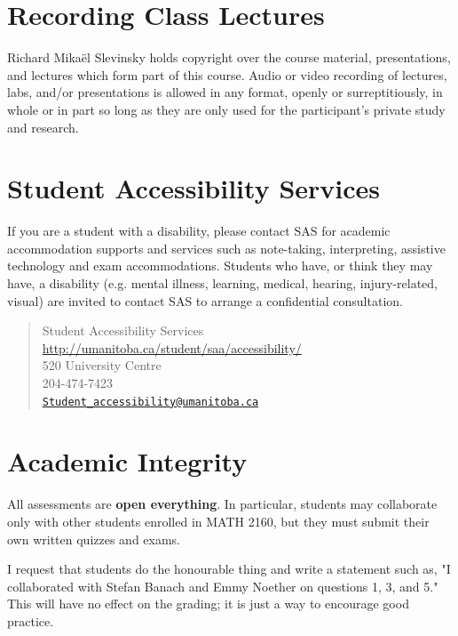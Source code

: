 \documentclass[12pt]{article}
\begin{document}
\section{Recording Class Lectures}

Richard Mika\"el Slevinsky holds copyright over the course material, presentations, and lectures which form part of this course. Audio or video recording of lectures, labs, and/or presentations is allowed in any format, openly or surreptitiously, in whole or in part so long as they are only used for the participant's private study and research.

\section{Student Accessibility Services}

If you are a student with a disability, please contact SAS for academic accommodation supports and services such as note-taking, interpreting, assistive technology and exam accommodations. Students who have, or think they may have, a disability (e.g. mental illness, learning, medical, hearing, injury-related, visual) are invited to contact SAS to arrange a confidential consultation. 

\begin{quote}
Student Accessibility Services \url{http://umanitoba.ca/student/saa/accessibility/} \\
520 University Centre \\
204-474-7423 \\
\href{mailto:Student_accessibility@umanitoba.ca}{\texttt{Student\_accessibility@umanitoba.ca}}
\end{quote}

\section{Academic Integrity}

All assessments are {\bf open everything}. In particular, students may collaborate only with other students enrolled in MATH 2160, but they must submit their own written quizzes and exams.

I request that students do the honourable thing and write a statement such as, "I collaborated with Stefan Banach and Emmy Noether on questions 1, 3, and 5." This will have no effect on the grading; it is just a way to encourage good practice.
\end{document}
